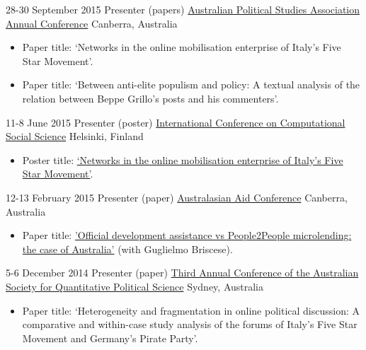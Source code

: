 \documentclass[11pt,a4paper,sans]{moderncv}
\begin{document}
    \cventry
        {28-30 September 2015} %
    {Presenter (papers)} %
    {\href{http://www.auspsa.org.au/page/apsa-conference-2015-0}{Australian Political Studies Association Annual Conference}} %
    {Canberra, Australia} %
{}
    {
      \begin{itemize} %
        \item {Paper title: `Networks in the online mobilisation enterprise of Italy's Five Star Movement'.}
        \item {Paper title: `Between anti-elite populism and policy: A textual analysis of the relation between Beppe Grillo's posts and his commenters'.}
      \end{itemize}
    }

    \cventry
        {11-8 June 2015} %
    {Presenter (poster)} %
    {\href{http://www.iccss2015.eu/}{International Conference on Computational Social Science}} %
    {Helsinki, Finland} %
{}
    {
      \begin{itemize} %
        \item {Poster title:  \href{http://www.francescobailo.net/wordpress/wp-content/uploads/2016/04/f_bailo_poster_iccss15_original.pdf}{`Networks in the online mobilisation enterprise of Italy's Five Star Movement'}.}
      \end{itemize}
    }

    \cventry
        {12-13 February 2015} %
    {Presenter (paper)} %
    {\href{https://devpolicy.crawford.anu.edu.au/annual-australasian-aid-conference/2015}{Australasian Aid Conference}} %
    {Canberra, Australia} %
{}
    {
      \begin{itemize} %
        \item {Paper title:  \href{http://devpolicy.org/2015-Australasian-aid-conference/presentations/2b/Guglielmo-Briscese-and-Francesco-Bailo.pdf}{'Official development assistance vs People2People microlending: the case of Australia'} (with Guglielmo Briscese).} 
      \end{itemize}
    }

    \cventry
        {5-6 December 2014} %
    {Presenter (paper)} %
    {\href{http://www.asqps.org.au/index.php/asqps/2014"}{Third Annual Conference of the Australian Society for Quantitative Political Science}} %
    {Sydney, Australia} %
{}
    {
      \begin{itemize} %
        \item {Paper title: `Heterogeneity and fragmentation in online political discussion: A comparative and within-case study analysis of the forums of Italy's Five Star Movement and Germany's Pirate Party'.}
      \end{itemize}
    }
\end{document}
